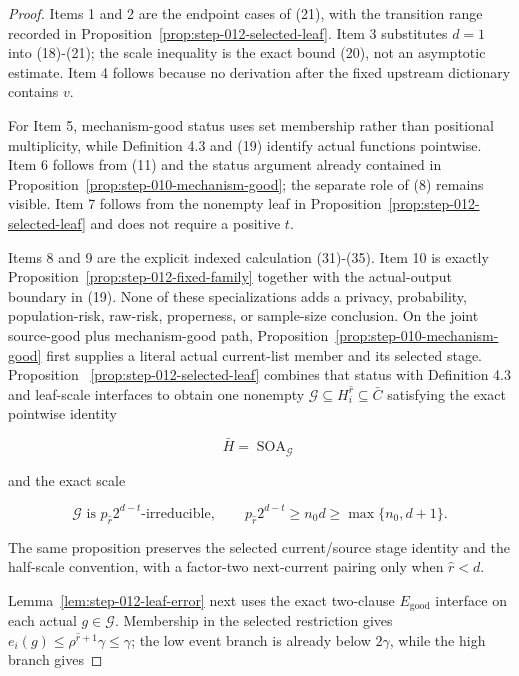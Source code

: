 \begin{proposition}
\end{proposition}

\begin{proof}
Items 1 and 2 are the endpoint cases of (21), with the
transition range recorded in
Proposition~\ref{prop:step-012-selected-leaf}. Item 3 substitutes \(d=1\)
into (18)-(21); the scale inequality is the  exact bound (20), not
an asymptotic estimate. Item 4 follows because no derivation after the
fixed upstream dictionary contains \(v\).

For Item 5,  mechanism-good status uses set membership rather than
positional multiplicity, while Definition 4.3 and (19) identify actual
functions pointwise. Item 6 follows from (11) and the status argument already
contained in Proposition~\ref{prop:step-010-mechanism-good}; the
separate role of (8) remains visible. Item 7 follows from the nonempty leaf
in Proposition~\ref{prop:step-012-selected-leaf} and does not require a
positive \(t\).

Items 8 and 9 are the explicit indexed calculation (31)-(35). Item 10 is
exactly Proposition~\ref{prop:step-012-fixed-family} together with the
actual-output boundary in (19). None of these specializations adds a
privacy, probability, population-risk, raw-risk, properness, or sample-size
conclusion. 
On the joint source-good plus mechanism-good path, Proposition~\ref{prop:step-010-mechanism-good} first supplies a literal
actual current-list member and its selected stage. Proposition
~\ref{prop:step-012-selected-leaf} combines that status with 
Definition 4.3 and leaf-scale interfaces to obtain one nonempty
\(\mathcal G\subseteq H_i^{\widehat r}\subseteq\bar C\) satisfying the
exact pointwise identity

\[
 \bar H=\operatorname{SOA}_{\mathcal G}
\]

and the exact scale

 \[
 \mathcal G\text{ is }p_{\widehat r}2^{d-t}\text{-irreducible},
 \qquad
 p_{\widehat r}2^{d-t}\ge n_0d
 \ge\max\{n_0,d+1\}.
 \]

The same proposition preserves the selected current/source stage identity
and the half-scale convention, with a factor-two next-current pairing only
when \(\widehat r<d\).

Lemma~\ref{lem:step-012-leaf-error} next uses the exact two-clause
\(E_{\mathrm{good}}\) interface on each actual
\(g\in\mathcal G\). Membership in the selected restriction gives
\(e_i(g)\le\rho^{\widehat r+1}\gamma\le\gamma\); the low event branch is
already below \(2\gamma\), while the high branch gives


\end{proof}
